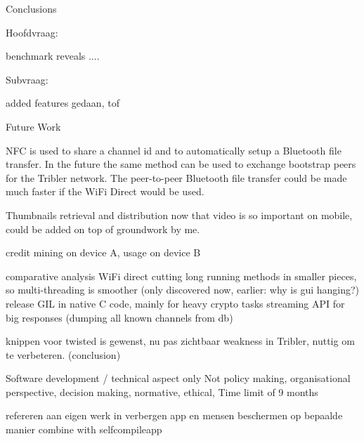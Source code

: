 Conclusions


Hoofdvraag:

benchmark reveals ....


Subvraag:

added features gedaan, tof



Future Work

NFC is used to share a channel id and to automatically setup a Bluetooth file transfer.
In the future the same method can be used to exchange bootstrap peers for the Tribler network.
The peer-to-peer Bluetooth file transfer could be made much faster if the WiFi Direct would be used.


Thumbnails retrieval and distribution now that video is so important on mobile, could be added on top of groundwork by me.


credit mining on device A, usage on device B


comparative analysis
WiFi direct
cutting long running methods in smaller pieces, so multi-threading is smoother (only discovered now, earlier: why is gui hanging?)
release GIL in native C code, mainly for heavy crypto tasks
streaming API for big responses (dumping all known channels from db)

knippen voor twisted is gewenst, nu pas zichtbaar weakness in Tribler, nuttig om te verbeteren. (conclusion)


Software development / technical aspect only
Not policy making, organisational perspective, decision making, normative, ethical,
Time limit of 9 months


refereren aan eigen werk in verbergen app en mensen beschermen op bepaalde manier
combine with selfcompileapp
